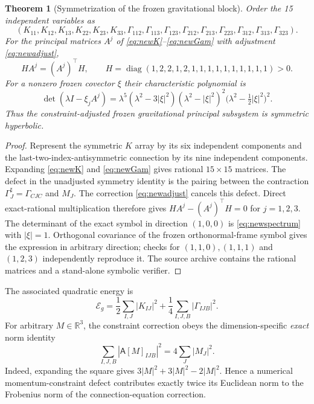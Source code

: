\documentclass[11pt,a4paper]{article}
\newtheorem{theorem}{Theorem}[section]
\theoremstyle{remark}
\begin{document}
\begin{theorem}[Symmetrization of the frozen gravitational block]\label{thm:newprincipal}
Order the 15 independent variables as
\[
(K_{11},K_{12},K_{13},K_{22},K_{23},K_{33},
\Gamma_{112},\Gamma_{113},\Gamma_{123},\Gamma_{212},\Gamma_{213},\Gamma_{223},\Gamma_{312},\Gamma_{313},\Gamma_{323}).
\]
For the principal matrices $A^j$ of \eqref{eq:newK}--\eqref{eq:newGam} with adjustment \eqref{eq:newadjust},
\[
H A^j=(A^j)^\top H,\qquad
H=\operatorname{diag}(1,2,2,1,2,1,1,1,1,1,1,1,1,1,1)>0.
\]
For a nonzero frozen covector $\xi$ their characteristic polynomial is
\begin{equation}\label{eq:newspectrum}
\det(\lambda I-\xi_jA^j)=
\lambda^5(\lambda^2-3|\xi|^2)(\lambda^2-|\xi|^2)^2
\bigl(\lambda^2-\tfrac12|\xi|^2\bigr)^2.
\end{equation}
Thus the constraint-adjusted \emph{frozen gravitational principal subsystem} is symmetric hyperbolic.
\end{theorem}
\begin{proof}
Represent the symmetric $K$ array by its six independent components and the last-two-index-antisymmetric connection by its nine independent components. Expanding \eqref{eq:newK} and \eqref{eq:newGam} gives rational $15\times15$ matrices. The defect in the unadjusted symmetry identity is the pairing between the contraction $\Gamma^\sharp_J=\Gamma_{CJC}$ and $M_J$. The correction \eqref{eq:newadjust} cancels this defect. Direct exact-rational multiplication therefore gives $HA^j-(A^j)^\top H=0$ for $j=1,2,3$. The determinant of the exact symbol in direction $(1,0,0)$ is \eqref{eq:newspectrum} with $|\xi|=1$. Orthogonal covariance of the frozen orthonormal-frame symbol gives the expression in arbitrary direction; checks for $(1,1,0),(1,1,1)$ and $(1,2,3)$ independently reproduce it. The source archive contains the rational matrices and a stand-alone symbolic verifier.
\end{proof}

The associated quadratic energy is
\[
\mathcal E_{g}=\frac12\sum_{I,J}|K_{IJ}|^2+
\frac14\sum_{I,J,B}|\Gamma_{IJB}|^2.
\]
For arbitrary $M\in\mathbb R^3$, the constraint correction obeys the dimension-specific \emph{exact} norm identity
\begin{equation}\label{eq:adjustnorm}
\sum_{I,J,B}|\mathsf A[M]_{IJB}|^2=4\sum_J|M_J|^2.
\end{equation}
Indeed, expanding the square gives $3|M|^2+3|M|^2-2|M|^2$. Hence a numerical momentum-constraint defect contributes exactly twice its Euclidean norm to the Frobenius norm of the connection-equation correction.
\end{document}
